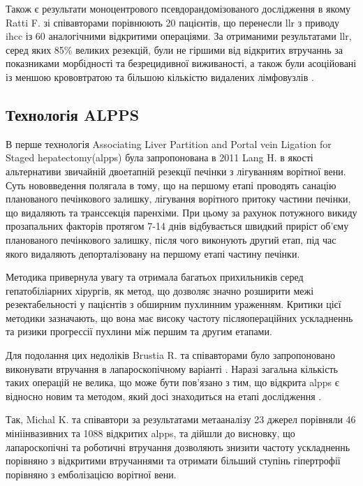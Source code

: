 \begin{refsection}
Також є результати моноцентрового псевдорандомізованого дослідження в якому Ratti F. зі співавторами порівнюють 20 пацієнтів, що перенесли \acrshort{llr} з приводу \acrshort{ihcc} із 60 аналогічними відкритими операціями. За отриманими результатами \acrshort{llr}, серед яких 85\% великих резекцій, були не гіршими від відкритих втручаннь за показниками морбідності та безрецидивної виживаності, а також були асоційовані із меншою крововтратою та більшою кількістю видалених лімфовузлів \cite{Ratti2016a}. 

\subsection{Технологія ALPPS} 

В перше технологія Associating Liver Partition and Portal vein Ligation for Staged hepatectomy(\acrshort{alpps}) була запропонована в 2011  Lang H.  \cite{Baumgart2011} в якості альтернативи звичайній двоетапній резекції печінки з лігуванням ворітної вени. Суть нововведення полягала в тому, що на першому етапі проводять санацію планованого печінкового залишку, лігування ворітного притоку  частини печінки, що видаляють та транссекція паренхіми. При цьому за рахунок потужного викиду прозапальних факторів протягом 7-14 днів відбувається швидкий приріст об'єму планованого печінкового залишку, після чого виконують другий етап, під час якого видаляють депорталізовану на першому етапі частину печінки. 

Методика привернула увагу та отримала багатьох прихильників серед гепатобіліарних хірургів, як метод, що дозволяє значно розширити межі резектабельності у пацієнтів з обширним пухлинним ураженням. Критики цієї методики зазначають, що вона має високу частоту післяопераційних ускладненнь та ризики прогрессії пухлини між першим та другим етапами. 

Для подолання цих недоліків Brustia R. та співавторами було запропоновано виконувати втручання в лапароскопічному варіанті \cite{Brustia2013}. Наразі загальна кількість таких операцій не велика, що може бути пов'язано з тим, що відкрита  \acrshort{alpps} є відносно новим та методом, який досі знаходиться на етапі дослідження \cite{Melandro2019}.

Так, Michal K. та співавтори \cite{Michal2020} за результатами метааналізу 23 джерел порівняли 46 мініінвазивних та 1088 відкритих \acrshort{alpps}, та дійшли до висновку, що лапароскопічні та роботичні втручання дозволяють знизити частоту ускладненнь порівняно з відкритими втручаннями та отримати більший ступінь гіпертрофії порівняно з емболізацією ворітної вени. 


\end{refsection}
